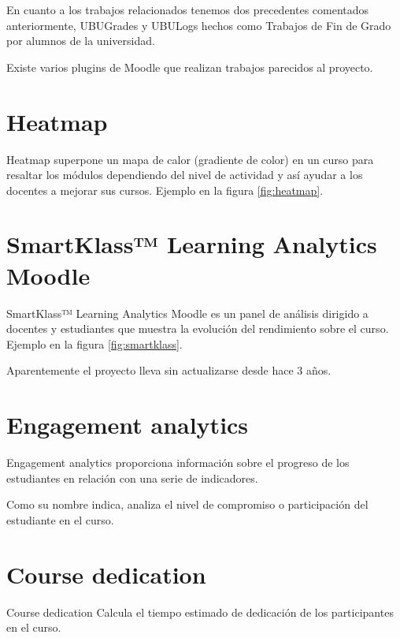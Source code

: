 
En cuanto a los trabajos relacionados tenemos dos precedentes comentados anteriormente, UBUGrades y UBULogs hechos como Trabajos de Fin de Grado por alumnos de la universidad.

Existe varios plugins de Moodle que realizan trabajos parecidos al proyecto.

\section{Heatmap}

Heatmap \cite{noauthor_moodle_nodate-2} superpone un mapa de calor (gradiente de color) en un curso para resaltar los módulos dependiendo del nivel de actividad y así ayudar a los docentes a mejorar sus cursos. Ejemplo en la figura \ref{fig:heatmap}.


\section{SmartKlass™ Learning Analytics Moodle}
SmartKlass™ Learning Analytics Moodle \cite{noauthor_moodle_nodate-3} es un panel de análisis dirigido a docentes y estudiantes que muestra la evolución del rendimiento sobre el curso. Ejemplo en la figura \ref{fig:smartklass}.

Aparentemente el proyecto lleva sin actualizarse desde hace 3 años\cite{noauthor_klassdata/moodle-local_smart_klass:_nodate}.


\section{Engagement analytics}

Engagement analytics \cite{noauthor_moodle_nodate-4} proporciona información sobre el progreso de los estudiantes en relación con una serie de indicadores.

Como su nombre indica, analiza el nivel de compromiso o participación del estudiante en el curso.

\section{Course dedication}

Course dedication \cite{noauthor_moodle_nodate-5} Calcula el tiempo estimado de dedicación de los participantes en el curso.




